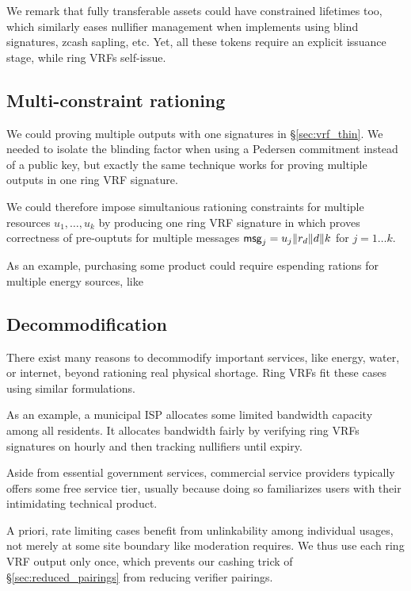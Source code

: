 We remark that fully transferable assets could have constrained lifetimes
too, which similarly eases nullifier management when implements using
blind signatures, zcash sapling, etc.  Yet, all these tokens require
an explicit issuance stage, while ring VRFs self-issue.


\subsection{Multi-constraint rationing}

We could proving multiple \ThinVRF outputs with one signatures
in \S\ref{sec:vrf_thin}.  We needed \PedVRF to isolate the blinding 
factor when using a Pedersen commitment instead of a public key, but
exactly the same technique works for proving multiple \PedVRF outputs
in one ring VRF signature.

We could therefore impose simultanious rationing constraints for multiple
resources $u_1,\ldots,u_k$ by producing one ring VRF signature in which
\PedVRF proves correctness of pre-ouptuts for multiple messages 
 $\mathsf{msg}_j = u_j \| r_d \| d \| k$ for $j=1 \ldots k$.

As an example, purchasing some product could require espending rations
for multiple energy sources, like  


\subsection{Decommodification}

There exist many reasons to decommodify important services,
like energy, water, or internet,
 beyond rationing real physical shortage.
Ring VRFs fit these cases using similar \msg formulations.

As an example, a municipal ISP allocates some limited bandwidth capacity
among all residents.  It allocates bandwidth fairly by verifying ring VRFs
signatures on hourly \msg and then tracking nullifiers until expiry.

Aside from essential government services, commercial service providers
typically offers some free service tier, usually because doing so
familiarizes users with their intimidating technical product.


A priori, rate limiting cases benefit from unlinkability among individual
usages, not merely at some site boundary like moderation requires.
We thus use each ring VRF output only once, which prevents our cashing
trick of \S\ref{sec:reduced_pairings} from reducing verifier pairings.

